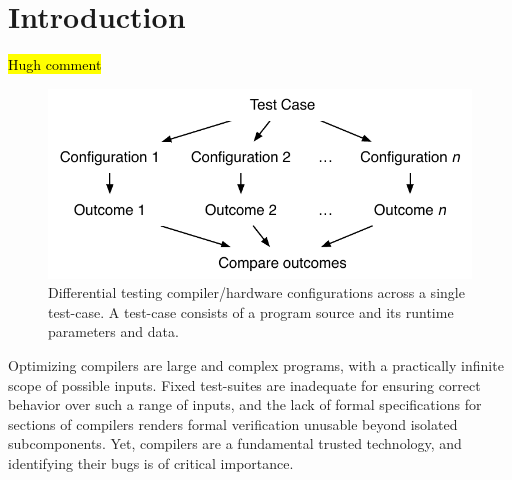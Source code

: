 \section{Introduction}\label{sec:intro}

\hl{Hugh comment}

\begin{figure}
  \centering
  \includegraphics[width=.85\columnwidth]{img/difftest} %
  \caption{%
    Differential testing compiler/hardware configurations across a single test-case. A test-case consists of a program source and its runtime parameters and data. %
  }%
  \label{fig:difftest}
\end{figure}

Optimizing compilers are large and complex programs, with a practically infinite scope of possible inputs. Fixed test-suites are inadequate for ensuring correct behavior over such a range of inputs, and the lack of formal specifications for sections of compilers renders formal verification unusable beyond isolated subcomponents. Yet, compilers are a fundamental trusted technology, and identifying their bugs is of critical importance.


